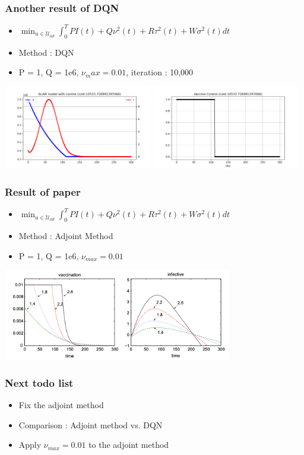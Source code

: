 \documentclass[usenames,dvipsnames, aspectratio=169, 9pt]{beamer}
\begin{document}
\begin{frame}\frametitle{Another result of DQN}
\begin{itemize}
\item $ \min_{u\in\mathcal{U}_{ad}} \int_0^T PI(t) + Q\nu^2(t) + R\tau^2(t) + W\sigma^2(t) dt$
\item Method : DQN
\item P = 1, Q = 1e6, $\nu_max = 0.01$, iteration : 10,000
\end{itemize}
    \centering
    \includegraphics[width=6.5cm]{figure/sliar_dqn_numax.png}
    \includegraphics[width=6.5cm]{figure/sliar_dqn_numax_control.png}
\end{frame}

\begin{frame}\frametitle{Result of paper}
\begin{itemize}
\item $ \min_{u\in\mathcal{U}_{ad}} \int_0^T PI(t) + Q\nu^2(t) + R\tau^2(t) + W\sigma^2(t) dt$
\item Method : Adjoint Method
\item P = 1, Q = 1e6, $\nu_{max} = 0.01$
\end{itemize}
    \centering
    \includegraphics[width=10cm]{figure/result_paper_original.png}
\end{frame}

\begin{frame}\frametitle{Next todo list}
\begin{itemize}
\item Fix the adjoint method
\item Comparison : Adjoint method vs. DQN
\item Apply $\nu_{max} = 0.01$ to the adjoint method
\end{itemize}
\end{frame}
\end{document}
